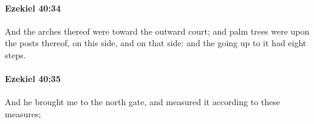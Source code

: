		\paragraph{Ezekiel 40:34} %
			\label{EZEKIEL-40-34}

			And the arches thereof were toward the outward court; and palm trees were upon the posts thereof, on this side, and on that side: and the going up to it had eight steps.


		\paragraph{Ezekiel 40:35} %
			\label{EZEKIEL-40-35}

			And he brought me to the north gate, and measured it according to these measures;


